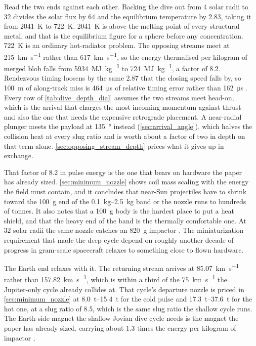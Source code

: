 \documentclass{article}
\begin{document}
Read the two ends against each other. Backing the dive out from 4 solar radii to 32 divides the solar flux by 64 and the equilibrium temperature by 2.83, taking it from \SI{2041}{\kelvin} to \SI{722}{\kelvin}. \SI{2041}{\kelvin} is above the melting point of every structural metal, and that is the equilibrium figure for a sphere before any concentration. \SI{722}{\kelvin} is an ordinary hot-radiator problem. The opposing streams meet at \SI{215}{\kilo\meter\per\second} rather than \SI{617}{\kilo\meter\per\second}, so the energy thermalised per kilogram of merged blob falls from \SI{5934}{\mega\joule\per\kilogram} to \SI{724}{\mega\joule\per\kilogram}, a factor of 8.2. Rendezvous timing loosens by the same 2.87 that the closing speed falls by, so \SI{100}{\meter} of along-track miss is \SI{464}{\micro\second} of relative timing error rather than \SI{162}{\micro\second} \cite{Katz_aim_is_all_you_need_2025}. Every row of \autoref{tab:dive_depth_dial} assumes the two streams meet head-on, which is the arrival that charges the most incoming momentum against thrust and also the one that needs the expensive retrograde placement. A near-radial plunger meets the payload at \SI{135}{\degree} instead (\autoref{sec:arrival_angle}), which halves the collision heat at every slug ratio and is worth about a factor of two in depth on that term alone. \autoref{sec:opposing_stream_depth} prices what it gives up in exchange.

That factor of 8.2 in pulse energy is the one that bears on hardware the paper has already sized. \autoref{sec:minimum_nozzle} shows coil mass scaling with the energy the field must contain, and it concludes that near-Sun projectiles have to shrink toward the \SI{100}{\gram} end of the \SIrange{0.1}{2.5}{\kilo\gram} band or the nozzle runs to hundreds of tonnes. It also notes that a \SI{100}{\gram} body is the hardest place to put a heat shield, and that the heavy end of the band is the thermally comfortable one. At 32 solar radii the same nozzle catches an \SI{820}{\gram} impactor \cite{Katz_aim_is_all_you_need_2025}. The miniaturization requirement that made the deep cycle depend on roughly another decade of progress in gram-scale spacecraft relaxes to something close to flown hardware.

The Earth end relaxes with it. The returning stream arrives at \SI{85.07}{\kilo\meter\per\second} rather than \SI{157.82}{\kilo\meter\per\second}, which is within a third of the \SI{75}{\kilo\meter\per\second} the Jupiter-only cycle already collides at. That cycle's departure nozzle is priced in \autoref{sec:minimum_nozzle} at \SIrange{8.0}{15.4}{\tonne} for the cold pulse and \SIrange{17.3}{37.6}{\tonne} for the hot one, at a slug ratio of 8.5, which is the same slug ratio the shallow cycle runs. The Earth-side magnet the shallow Jovian dive cycle needs is the magnet the paper has already sized, carrying about 1.3 times the energy per kilogram of impactor \cite{Katz_aim_is_all_you_need_2025}.
\end{document}
